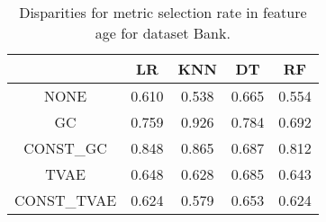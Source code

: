 \begin{table}
\caption{Disparities for metric selection rate in feature age for dataset Bank.}
\label{tab:disp-BANK-age-selection_rate}
\begin{tabular}{ccccc}
\toprule
 & LR & KNN & DT & RF \\
\midrule
NONE & 0.610 & 0.538 & 0.665 & 0.554 \\
GC & 0.759 & 0.926 & 0.784 & 0.692 \\
CONST\_GC & 0.848 & 0.865 & 0.687 & 0.812 \\
TVAE & 0.648 & 0.628 & 0.685 & 0.643 \\
CONST\_TVAE & 0.624 & 0.579 & 0.653 & 0.624 \\
\bottomrule
\end{tabular}
\end{table}
